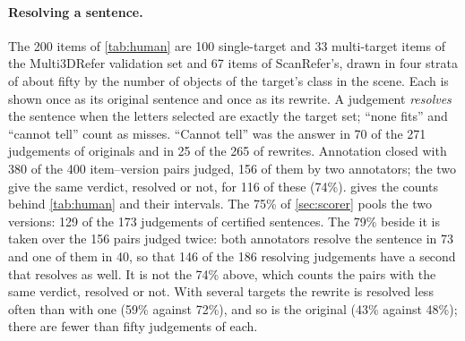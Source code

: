 \paragraph{Resolving a sentence.}
The 200 items of \cref{tab:human} are 100 single-target and 33 multi-target items of the Multi3DRefer validation set and 67 items of ScanRefer's, drawn in four strata of about fifty by the number of objects of the target's class in the scene.
Each is shown once as its original sentence and once as its rewrite.
A judgement \emph{resolves} the sentence when the letters selected are exactly the target set; ``none fits'' and ``cannot tell'' count as misses.
``Cannot tell'' was the answer in 70 of the 271 judgements of originals and in 25 of the 265 of rewrites.
Annotation closed with 380 of the 400 item--version pairs judged, 156 of them by two annotators; the two give the same verdict, resolved or not, for 116 of these (74\%).
 gives the counts behind \cref{tab:human} and their intervals.
The 75\% of \cref{sec:scorer} pools the two versions: 129 of the 173 judgements of certified sentences.
The 79\% beside it is taken over the 156 pairs judged twice: both annotators resolve the sentence in 73 and one of them in 40, so that 146 of the 186 resolving judgements have a second that resolves as well.
It is not the 74\% above, which counts the pairs with the same verdict, resolved or not.
With several targets the rewrite is resolved less often than with one (59\% against 72\%), and so is the original (43\% against 48\%); there are fewer than fifty judgements of each.


